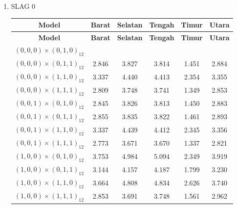 \begin{enumerate}[label=\alph*.]
    \label{lampiran:rmse-cross}
    \item SLAG 0
    \begin{longtable}{|c|c|c|c|c|c|}
        \hline
        \textbf{Model} & \textbf{Barat} & \textbf{Selatan} & \textbf{Tengah} & \textbf{Timur} & \textbf{Utara} \\
        \hline
        \endfirsthead

        \hline
        \textbf{Model} & \textbf{Barat} & \textbf{Selatan} & \textbf{Tengah} & \textbf{Timur} & \textbf{Utara} \\
        \hline
        \endhead

        \hline
        \endfoot
        \hline
        \endlastfoot

        {$(0,0,0) \times (0,1,0)_{12}$} &  &  &  &  &  \\ \hline
        {$(0,0,0) \times (0,1,1)_{12}$} & 2.846 & 3.827 & 3.814 & 1.451 & 2.884 \\ \hline
        {$(0,0,0) \times (1,1,0)_{12}$} & 3.337 & 4.440 & 4.413 & 2.354 & 3.355 \\ \hline
        {$(0,0,0) \times (1,1,1)_{12}$} & 2.809 & 3.748 & 3.741 & 1.349 & 2.853 \\ \hline

        {$(0,0,1) \times (0,1,0)_{12}$} & 2.845 & 3.826 & 3.813 & 1.450 & 2.883 \\ \hline
        {$(0,0,1) \times (0,1,1)_{12}$} & 2.855 & 3.835 & 3.822 & 1.461 & 2.893 \\ \hline
        {$(0,0,1) \times (1,1,0)_{12}$} & 3.337 & 4.439 & 4.412 & 2.345 & 3.356 \\ \hline
        {$(0,0,1) \times (1,1,1)_{12}$} & 2.773 & 3.671 & 3.670 & 1.337 & 2.821 \\ \hline

        {$(1,0,0) \times (0,1,0)_{12}$} & 3.753 & 4.984 & 5.094 & 2.349 & 3.919 \\ \hline
        {$(1,0,0) \times (0,1,1)_{12}$} & 3.144 & 4.157 & 4.187 & 1.799 & 3.230 \\ \hline
        {$(1,0,0) \times (1,1,0)_{12}$} & 3.664 & 4.808 & 4.834 & 2.626 & 3.740 \\ \hline
        {$(1,0,0) \times (1,1,1)_{12}$} & 2.853 & 3.691 & 3.748 & 1.561 & 2.962 \\ \hline


\end{longtable}
\end{enumerate}
